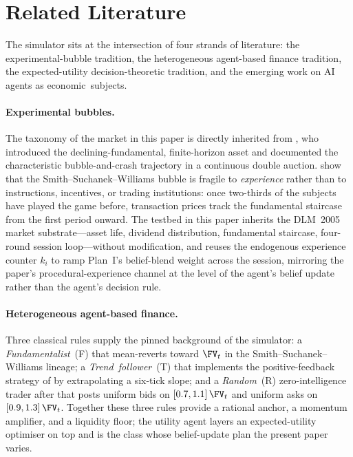 \section{Related Literature}
\label{sec:related}

The simulator sits at the intersection of four strands of
literature: the experimental-bubble tradition, the heterogeneous
agent-based finance tradition, the expected-utility decision-theoretic
tradition, and the emerging work on AI agents as
economic~subjects.

\paragraph{Experimental bubbles.} The taxonomy of the market
in this paper is directly inherited from \citet{smith1988bubbles},
who introduced the declining-fundamental, finite-horizon asset and
documented the characteristic bubble-and-crash trajectory in a
continuous double auction. \citet{dufwenberg2005bubbles} show that
the Smith--Suchanek--Williams bubble is fragile to \emph{experience}
rather than to instructions, incentives, or trading institutions:
once two-thirds of the subjects have played the game before,
transaction prices track the fundamental staircase from the first
period onward. The testbed in this paper inherits the DLM~2005
market substrate---asset life, dividend distribution, fundamental
staircase, four-round session loop---without modification, and
reuses the endogenous experience counter $k_i$ to ramp Plan~I's
belief-blend weight across the session, mirroring the paper's
procedural-experience channel at the level of the agent's belief
update rather than the agent's decision rule.

\paragraph{Heterogeneous agent-based finance.} Three classical
rules supply the pinned background of the simulator: a
\emph{Fundamentalist}~(F) that mean-reverts toward $\FV_t$ in the
Smith--Suchanek--Williams lineage; a \emph{Trend~follower}~(T) that
implements the positive-feedback strategy of
\citet{delong1990positive} by extrapolating a six-tick slope; and
a \emph{Random}~(R) zero-intelligence trader after
\citet{gode1993allocative} that posts uniform bids on
$[0.7,1.1]\,\FV_t$ and uniform asks on $[0.9,1.3]\,\FV_t$.
Together these three rules provide a rational anchor, a momentum
amplifier, and a liquidity floor; the utility agent layers an
expected-utility optimiser on top and is the class whose
belief-update plan the present paper varies.

